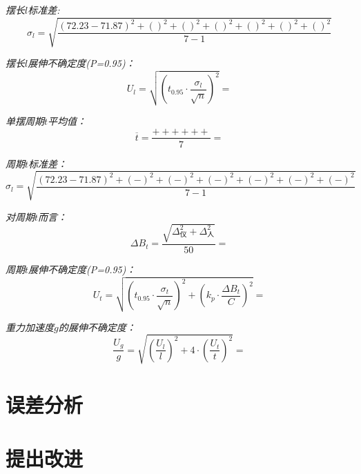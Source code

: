 \documentclass[UTF8]{ctexart}
\begin{document}
        \emph{摆长$l$标准差:}
        \begin{equation}
            \sigma _l=\sqrt{\frac{(72.23-71.87)^2+()^2+()^2+()^2+()^2+()^2+()^2}{7-1}}
        \end{equation}

        \emph{摆长$l$展伸不确定度(P=0.95)：}
        \begin{equation}
            U_{l}=\sqrt{(t_{0.95}·\frac{\sigma _l}{\sqrt{n}})^2}=
        \end{equation}

        \emph{单摆周期$t$平均值：}
        \begin{equation}
            \overline{t}=\frac{ +  +  + + + +}{7} =
        \end{equation}

        \emph{周期$t$标准差：}
        \begin{equation}
            \sigma _l=\sqrt{\frac{(72.23-71.87)^2+(-)^2+(-)^2+(-)^2+(-)^2+(-)^2+(-)^2}{7-1}} 
        \end{equation}

        \emph{对周期$t$而言：}
        \begin{equation}
            \varDelta B_t=\frac{\sqrt{\varDelta _仪^2+\varDelta _人^2}}{50}=
        \end{equation}

        \emph{周期$t$展伸不确定度(P=0.95)：}
        \begin{equation}
           U_{t}=\sqrt{(t_{0.95}·\frac{\sigma _t}{\sqrt{n}})^2+(k_p·\frac{\varDelta B_t}{C})^2}= 
        \end{equation}

        \emph{重力加速度$g$的展伸不确定度：}
        \begin{equation}
            \frac{U_g}{g}=\sqrt{(\frac{U_l}{l})^2+4·(\frac{U_t}{t})^2}=
        \end{equation}
    \section{误差分析}

    \section{提出改进}

    \nocite{a}
    \nocite{b}
    \nocite{c}
    \nocite{d}
    
\end{document}
